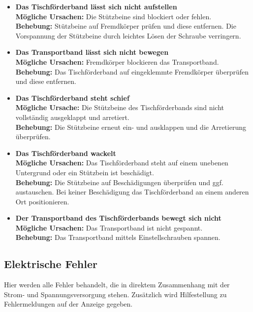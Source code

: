 \begin{itemize}
	\item \textbf{Das Tischförderband lässt sich nicht aufstellen} \\
	\textbf{Mögliche Ursachen:} Die Stützbeine sind blockiert oder fehlen. \\
	\textbf{Behebung:} Stützbeine auf Fremdkörper prüfen und diese entfernen. Die Vorspannung der Stützbeine durch leichtes Lösen der Schraube verringern.
	
	\item \textbf{Das Transportband lässt sich nicht bewegen} \\
	\textbf{Mögliche Ursachen:} Fremdkörper blockieren das Transportband. \\
	\textbf{Behebung:} Das Tischförderband auf eingeklemmte Fremdkörper überprüfen und diese entfernen. 
	
	\item \textbf{Das Tischförderband steht schief} \\ 
	\textbf{Mögliche Ursache:} Die Stützbeine des Tischförderbands sind nicht vollständig ausgeklappt und arretiert. \\
	\textbf{Behebung:} Die Stützbeine erneut ein- und ausklappen und die Arretierung überprüfen.  
	
	\item \textbf{Das Tischförderband wackelt} \\ 
	\textbf{Mögliche Ursachen:} Das Tischförderband steht auf einem unebenen Untergrund oder ein Stützbein ist beschädigt. \\ 
	\textbf{Behebung:} Die Stützbeine auf Beschädigungen überprüfen und ggf. austauschen. Bei keiner Beschädigung das Tischförderband an einem anderen Ort positionieren. 
	
	\item \textbf{Der Transportband des Tischförderbands bewegt sich nicht} \\ 
	\textbf{Mögliche Ursachen:} Das Transportband ist nicht gespannt. \\ 
	\textbf{Behebung:} Das Transportband mittels Einstellschrauben spannen. 
	
\end{itemize}

\subsection{Elektrische Fehler}
Hier werden alle Fehler behandelt, die in direktem Zusammenhang mit der Strom- und Spannungsversorgung stehen. Zusätzlich wird Hilfestellung zu Fehlermeldungen auf der Anzeige gegeben.

